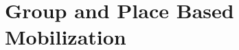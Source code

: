 \documentclass[12pt]{article}
\newcommand{\kscomment}[1]{\textbf{\textcolor{Thistle}{[[ #1 --- KS ]]}}}
\newcommand{\kmcomment}[1]{\textbf{\textcolor{JungleGreen}{[[ #1 --- KM ]]}}}
\begin{document}
\section*{Group and Place Based Mobilization}

\end{document}
